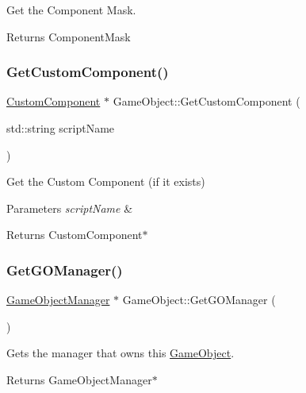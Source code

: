 Get the Component Mask. 

\begin{DoxyReturn}{Returns}
Component\+Mask 
\end{DoxyReturn}
\mbox{\label{classGameObject_af5b410a717cc1b1b1729684f75a73f36}} 
\subsubsection{\texorpdfstring{Get\+Custom\+Component()}{GetCustomComponent()}}
{\footnotesize\ttfamily \hyperlink{classCustomComponent}{Custom\+Component} $\ast$ Game\+Object\+::\+Get\+Custom\+Component (\begin{DoxyParamCaption}\item[{std\+::string}]{script\+Name }\end{DoxyParamCaption})}



Get the Custom Component (if it exists) 


\begin{DoxyParams}{Parameters}
{\em script\+Name} & \\
\hline
\end{DoxyParams}
\begin{DoxyReturn}{Returns}
Custom\+Component$\ast$ 
\end{DoxyReturn}
\mbox{\label{classGameObject_ade4a81b6b0ed07ef656fc5c636ae648b}} 
\subsubsection{\texorpdfstring{Get\+G\+O\+Manager()}{GetGOManager()}}
{\footnotesize\ttfamily \hyperlink{classGameObjectManager}{Game\+Object\+Manager} $\ast$ Game\+Object\+::\+Get\+G\+O\+Manager (\begin{DoxyParamCaption}{ }\end{DoxyParamCaption})}



Gets the manager that owns this \hyperlink{classGameObject}{Game\+Object}. 

\begin{DoxyReturn}{Returns}
Game\+Object\+Manager$\ast$ 
\end{DoxyReturn}
\mbox{\label{classGameObject_a47a9e2307a23923343e23d6c8c4223c1}} 
